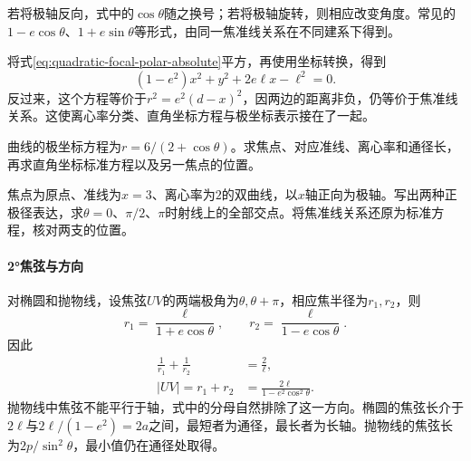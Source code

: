 若将极轴反向，式中的\(\cos\theta\)随之换号；若将极轴旋转，则相应改变角度。常见的\(1-e\cos\theta\)、\(1+e\sin\theta\)等形式，由同一焦准线关系在不同建系下得到。

将式\eqref{eq:quadratic-focal-polar-absolute}平方，再使用坐标转换，得到
\begin{equation}\label{eq:quadratic-focal-polar-cartesian}
 (1-e^2)x^2+y^2+2e\ell x-\ell^2=0.
\end{equation}
反过来，这个方程等价于\(r^2=e^2(d-x)^2\)，因两边的距离非负，仍等价于焦准线关系。这使离心率分类、直角坐标方程与极坐标表示接在了一起。

\par\addvspace{6pt}\noindent\begin{minipage}{\linewidth}
\begin{example}
曲线的极坐标方程为\(r=6/(2+\cos\theta)\)。求焦点、对应准线、离心率和通径长，再求直角坐标标准方程以及另一焦点的位置。
\end{example}
\end{minipage}\par\addvspace{6pt}

\par\addvspace{6pt}\noindent\begin{minipage}{\linewidth}
\begin{example}
焦点为原点、准线为\(x=3\)、离心率为\(2\)的双曲线，以\(x\)轴正向为极轴。写出两种正极径表达，求\(\theta=0\)、\(\pi/2\)、\(\pi\)时射线上的全部交点。将焦准线关系还原为标准方程，核对两支的位置。
\end{example}
\end{minipage}\par\addvspace{6pt}

\paragraph{2°焦弦与方向} \mbox{}

对椭圆和抛物线，设焦弦\(UV\)的两端极角为\(\theta,\theta+\pi\)，相应焦半径为\(r_1,r_2\)，则
\begin{equation*}
 r_1=\frac{\ell}{1+e\cos\theta},\qquad
 r_2=\frac{\ell}{1-e\cos\theta}.
\end{equation*}
因此
\begin{align}
 \frac1{r_1}+\frac1{r_2}&=\frac2\ell,
 \label{eq:quadratic-focal-polar-reciprocals}\\
 |UV|=r_1+r_2&=\frac{2\ell}{1-e^2\cos^2\theta}.
 \label{eq:quadratic-focal-polar-chord-length}
\end{align}
抛物线中焦弦不能平行于轴，式中的分母自然排除了这一方向。椭圆的焦弦长介于\(2\ell\)与\(2\ell/(1-e^2)=2a\)之间，最短者为通径，最长者为长轴。抛物线的焦弦长为\(2p/\sin^2\theta\)，最小值仍在通径处取得。

